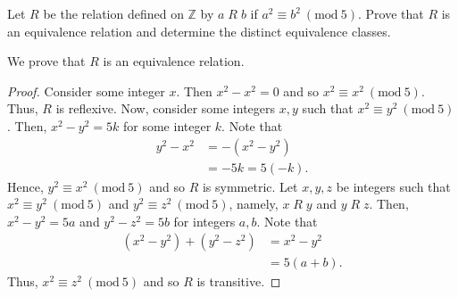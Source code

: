\documentclass[12pt]{article}
\newcommand{\Z}{\mathbb{Z}}
\newcommand{\Mod}[1]{\ (\mathrm{mod}\ #1)}
\newenvironment{problem}[2][Problem]{\begin{trivlist} \item[\hskip \labelsep {\bfseries #1}\hskip \labelsep {\bfseries #2.}]}{\end{trivlist}}
\newenvironment{solution}[2][Solution]{\begin{trivlist} \item[\hskip \labelsep {\bfseries #1}\hskip \labelsep {\bfseries #2.}]}{\end{trivlist}}
\begin{document}
\begin{problem}{52}
  Let $R$ be the relation defined on $\Z$ by $a\; R\;b$ if $a^{2} \equiv b^{2} \Mod 5$. Prove that $R$ is an equivalence relation and determine the distinct equivalence classes.
  \begin{solution}{52}
    We prove that $R$ is an equivalence relation.
    \begin{proof}
      Consider some integer $x$. Then $x^{2}-x^{2}=0$ and so $x^{2} \equiv x^{2} \Mod 5$. Thus, $R$ is reflexive. Now, consider some integers $x,y$ such that $x^{2} \equiv y^{2} \Mod 5$. Then, $x^{2}-y^{2} = 5k$ for some integer $k$. Note that 
      \begin{align*}
	y^{2}-x^{2} &= -(x^{2}-y^{2})\\
	&= -5k = 5(-k).
      \end{align*}
      Hence, $y^{2} \equiv x^{2} \Mod 5$ and so $R$ is symmetric. Let $x,y,z$ be integers such that $x^{2} \equiv y^{2} \Mod 5$ and $y^{2} \equiv z^{2} \Mod 5$, namely, $x\; R\;y$ and $y\; R \;z$. Then, $x^{2} - y^{2} = 5a$ and $y^{2}-z^{2} = 5b$ for integers $a,b$. Note that
    \begin{align*}
      (x^{2}-y^{2}) + (y^{2}-z^{2}) &= x^{2}-y^{2}\\
      &= 5(a+b).
    \end{align*}
    Thus, $x^{2} \equiv z^{2} \Mod 5$ and so $R$ is transitive.
    \end{proof}


\end{solution}
\end{problem}
\end{document}
